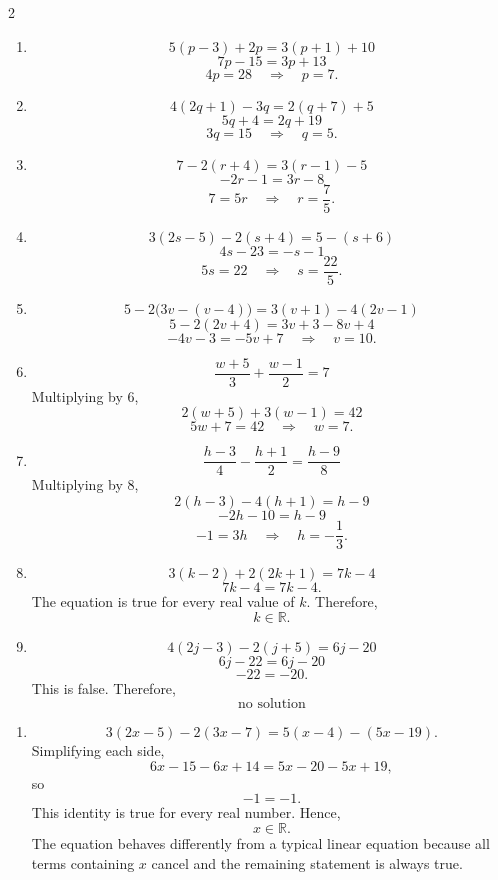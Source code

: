 \begin{multicols}{2}
\begin{enumerate}[label=\textbf{\arabic*.},start=8]
			\item
			\[
			5(p-3)+2p=3(p+1)+10
			\]
			\[
			7p-15=3p+13
			\]
			\[
			4p=28
			\quad\Longrightarrow\quad
			\boxed{p=7}.
			\]
			
			\item
			\[
			4(2q+1)-3q=2(q+7)+5
			\]
			\[
			5q+4=2q+19
			\]
			\[
			3q=15
			\quad\Longrightarrow\quad
			\boxed{q=5}.
			\]
			
			\item
			\[
			7-2(r+4)=3(r-1)-5
			\]
			\[
			-2r-1=3r-8
			\]
			\[
			7=5r
			\quad\Longrightarrow\quad
			\boxed{r=\frac{7}{5}}.
			\]
			
			\item
			\[
			3(2s-5)-2(s+4)=5-(s+6)
			\]
			\[
			4s-23=-s-1
			\]
			\[
			5s=22
			\quad\Longrightarrow\quad
			\boxed{s=\frac{22}{5}}.
			\]
			
			\item
			\[
			5-2\bigl(3v-(v-4)\bigr)
			=3(v+1)-4(2v-1)
			\]
			\[
			5-2(2v+4)=3v+3-8v+4
			\]
			\[
			-4v-3=-5v+7
			\quad\Longrightarrow\quad
			\boxed{v=10}.
			\]
			
			\item
			\[
			\frac{w+5}{3}+\frac{w-1}{2}=7
			\]
			Multiplying by $6$,
			\[
			2(w+5)+3(w-1)=42
			\]
			\[
			5w+7=42
			\quad\Longrightarrow\quad
			\boxed{w=7}.
			\]
			
			\item
			\[
			\frac{h-3}{4}-\frac{h+1}{2}
			=\frac{h-9}{8}
			\]
			Multiplying by $8$,
			\[
			2(h-3)-4(h+1)=h-9
			\]
			\[
			-2h-10=h-9
			\]
			\[
			-1=3h
			\quad\Longrightarrow\quad
			\boxed{h=-\frac{1}{3}}.
			\]
			
			\item
			\[
			3(k-2)+2(2k+1)=7k-4
			\]
			\[
			7k-4=7k-4.
			\]
			The equation is true for every real value of $k$. Therefore,
			\[
			\boxed{k\in\mathbb{R}}.
			\]
			
			\item
			\[
			4(2j-3)-2(j+5)=6j-20
			\]
			\[
			6j-22=6j-20
			\]
			\[
			-22=-20.
			\]
			This is false. Therefore,
			\[
			\boxed{\text{no solution}}
			\]
			
		\end{enumerate}
		
		
		
		\begin{enumerate}[label=\textbf{\arabic*.}]
			
			\item
			\[
			3(2x-5)-2(3x-7)
			=
			5(x-4)-(5x-19).
			\]
			Simplifying each side,
			\[
			6x-15-6x+14
			=
			5x-20-5x+19,
			\]
			so
			\[
			-1=-1.
			\]
			This identity is true for every real number. Hence,
			\[
			\boxed{x\in\mathbb{R}}.
			\]
			The equation behaves differently from a typical linear equation because
			all terms containing $x$ cancel and the remaining statement is always true.
			

\end{enumerate}
\end{multicols}
